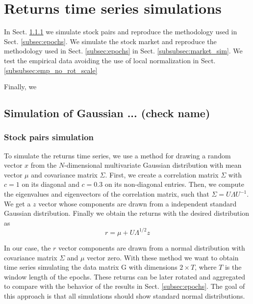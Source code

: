 \section{Returns time series simulations}
\label{sec:simulations}

In Sect. \ref{subsubsec:pairs_sim} we simulate stock pairs and reproduce the
methodology used in Sect. \ref{subsec:epochs}. We simulate the stock market
and reproduce the methodology used in Sect. \ref{subsec:epochs} in Sect.
\ref{subsubsec:market_sim}. We test the empirical data avoiding the use of
local normalization in Sect. \ref{subsubsec:emp_no_rot_scale}

Finally, we

\subsection{Simulation of Gaussian ... (check name)}
\label{subsec:gaussian_sim}

\subsubsection{Stock pairs simulation}\label{subsubsec:pairs_sim}

To simulate the returns time series, we use a method \cite{drawing_dist} for
drawing a random vector $x$ from the $N$-dimensional multivariate Gaussian
distribution with mean vector $\mu$ and covariance matrix $\Sigma$. First, we
create a correlation matrix $\Sigma$ with $c = 1$ on its diagonal and $c = 0.3$
on its non-diagonal entries. Then, we compute the eigenvalues and eigenvectors
of the correlation matrix, such that $\Sigma = U \Lambda U^{-1}$. We get a $z$
vector whose components are drawn from a independent standard Gaussian
distribution. Finally we obtain the returns with the desired distribution as
\begin{equation}
    r = \mu + U \Lambda^{1/2} z
\end{equation}

In our case, the $r$ vector components are drawn from a normal distribution
with covariance matrix $\Sigma$ and $\mu$ vector zero.
With these method we want to obtain time series simulating the data matrix G
with dimensions $2 \times T$, where $T$ is the window length of the epochs.
These returns can be later rotated and aggregated to compare with the behavior
of the results in Sect. \ref{subsec:epochs}.
The goal of this approach is that all simulations should show standard normal
distributions.

